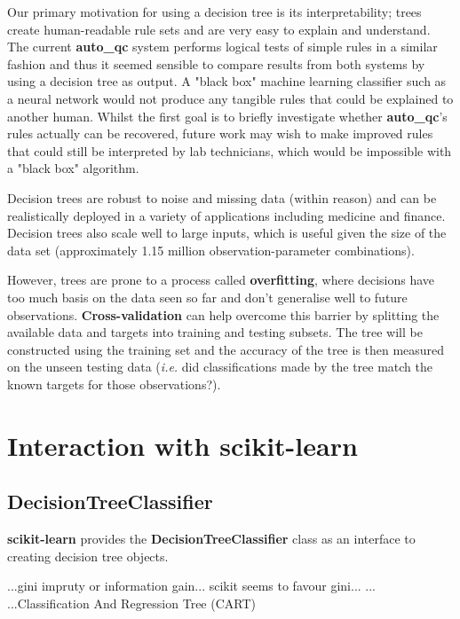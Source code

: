 Our primary motivation for using a decision tree is its interpretability; trees
create human-readable rule sets and are very easy to explain and understand. The
current \textbf{auto\_qc} system performs logical tests of simple rules in a
similar fashion and thus it seemed sensible to compare results from both systems
by using a decision tree as output. A "black box" machine learning
classifier such as a neural network would not produce any tangible rules that
could be explained to another human. Whilst the first goal is to briefly
investigate whether \textbf{auto\_qc}'s rules actually can be recovered, future work may
wish to make improved rules that could still be interpreted by lab technicians,
which would be impossible with a "black box" algorithm.

Decision trees are robust to noise and missing data (within reason) and can be
realistically deployed in a variety of applications including medicine and
finance. Decision trees also scale well to large inputs, which is useful given
the size of the data set (approximately 1.15 million observation-parameter
combinations).

However, trees are prone to a process called \textbf{overfitting}, where
decisions have too much basis on the data seen so far and don't generalise well
to future observations. \textbf{Cross-validation} can help overcome this barrier
by splitting the available data and targets into training and testing subsets.
The tree will be constructed using the training set and the accuracy of the tree
is then measured on the unseen testing data (\textit{i.e.} did classifications
made by the tree match the known targets for those observations?).

\section{Interaction with scikit-learn}
\subsection{DecisionTreeClassifier}

\textbf{scikit-learn} provides the \textbf{DecisionTreeClassifier} class as an
interface to creating decision tree objects. 

...gini impruty or information gain... scikit seems to favour gini...
...
...Classification And Regression Tree (CART)



